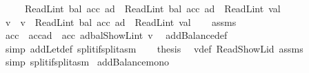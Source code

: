 \begin{isabellebody}
\ \ \ \ \ {\isachardoublequoteopen}ReadL\isactrlsub i\isactrlsub n\isactrlsub t\ {\isacharparenleft}{\kern0pt}bal\ {\isacharparenleft}{\kern0pt}acc{\isacharprime}{\kern0pt}\ ad{\isacharparenright}{\kern0pt}{\isacharparenright}{\kern0pt}\ {\isacharequal}{\kern0pt}\ ReadL\isactrlsub i\isactrlsub n\isactrlsub t\ {\isacharparenleft}{\kern0pt}bal\ {\isacharparenleft}{\kern0pt}acc\ ad{\isacharparenright}{\kern0pt}{\isacharparenright}{\kern0pt}\ {\isacharplus}{\kern0pt}\ ReadL\isactrlsub i\isactrlsub n\isactrlsub t\ val{\isachardoublequoteclose}\isanewline
%
\isadelimproof
%
\endisadelimproof
%
\isatagproof
{}\isamarkupfalse%
\ {\isacharminus}{\kern0pt}\isanewline
\ \ \isamarkupfalse%
\ v\ \ {\isachardoublequoteopen}v\ {\isacharequal}{\kern0pt}\ ReadL\isactrlsub i\isactrlsub n\isactrlsub t\ {\isacharparenleft}{\kern0pt}bal\ {\isacharparenleft}{\kern0pt}acc\ ad{\isacharparenright}{\kern0pt}{\isacharparenright}{\kern0pt}\ {\isacharplus}{\kern0pt}\ ReadL\isactrlsub i\isactrlsub n\isactrlsub t\ val{\isachardoublequoteclose}\isanewline
\ \ \isamarkupfalse%
\ assms\ \isamarkupfalse%
\ {\isachardoublequoteopen}acc{\isacharprime}{\kern0pt}\ {\isacharequal}{\kern0pt}\ acc{\isacharparenleft}{\kern0pt}ad\ {\isacharcolon}{\kern0pt}{\isacharequal}{\kern0pt}\ acc\ ad{\isasymlparr}bal{\isacharcolon}{\kern0pt}{\isacharequal}{\kern0pt}ShowL\isactrlsub i\isactrlsub n\isactrlsub t\ v{\isasymrparr}{\isacharparenright}{\kern0pt}{\isachardoublequoteclose}\ \isamarkupfalse%
\ addBalance{\isacharunderscore}{\kern0pt}def\ \isamarkupfalse%
\ {\isacharparenleft}{\kern0pt}simp\ add{\isacharcolon}{\kern0pt}Let{\isacharunderscore}{\kern0pt}def\ split{\isacharcolon}{\kern0pt}if{\isacharunderscore}{\kern0pt}split{\isacharunderscore}{\kern0pt}asm{\isacharparenright}{\kern0pt}\isanewline
\ \ \isamarkupfalse%
\ {\isacharquery}{\kern0pt}thesis\ \isamarkupfalse%
\ v{\isacharunderscore}{\kern0pt}def\ Read{\isacharunderscore}{\kern0pt}ShowL{\isacharunderscore}{\kern0pt}id\ assms\ \isamarkupfalse%
\ {\isacharparenleft}{\kern0pt}simp\ split{\isacharcolon}{\kern0pt}if{\isacharunderscore}{\kern0pt}split{\isacharunderscore}{\kern0pt}asm{\isacharparenright}{\kern0pt}\isanewline
{}\isamarkupfalse%
%
\endisatagproof
{\isafoldproof}%
%
\isadelimproof
\isanewline
%
\endisadelimproof
\isanewline
{}\isamarkupfalse%
\ addBalance{\isacharunderscore}{\kern0pt}mono{\isacharcolon}{\kern0pt}\isanewline

\end{isabellebody}
